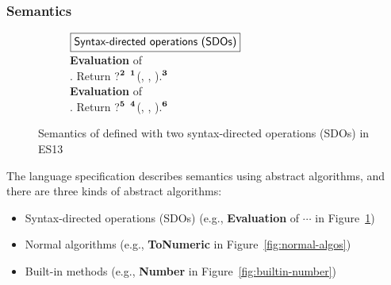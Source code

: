 
\subsubsection{Semantics}\label{sec:sem}

\begin{figure}
  \centering
  \begin{subfigure}{\textwidth}
    \small
    $\fbox{\textsf{Syntax-directed operations (SDOs)}}$
    \vspace*{0.5em}\\
    \textbf{Evaluation} of
     \est{:}  \est{+}
    \\
    \null{}. Return ?${}^{\textbf{2}}$
    ${}^{\textbf{1}}$(,
    \escode{+}, ).${}^{\textbf{3}}$
    \vspace*{0.5em}\\
    \textbf{Evaluation} of
     \est{:}  \est{-}
    \\
    \null{}. Return ?${}^{\textbf{5}}$
    ${}^{\textbf{4}}$(,
    \escode{-}, ).${}^{\textbf{6}}$

  \end{subfigure}
\vspace*{-1.5em}
  \caption{
    Semantics of  defined with two syntax-directed
    operations (SDOs) in ES13
  }
  \label{fig:add-sdo}
\end{figure}

The language specification describes semantics using abstract algorithms, and
there are three kinds of abstract algorithms:
%
\begin{itemize}
  \item Syntax-directed operations (SDOs) (e.g., \textbf{Evaluation} of
     \est{:} $\cdots$ in Figure~\ref{fig:add-sdo})

  \item Normal algorithms (e.g., \textbf{ToNumeric} in
    Figure~\ref{fig:normal-algos})

  \item Built-in methods (e.g., \textbf{Number} in
    Figure~\ref{fig:builtin-number})
\end{itemize}

